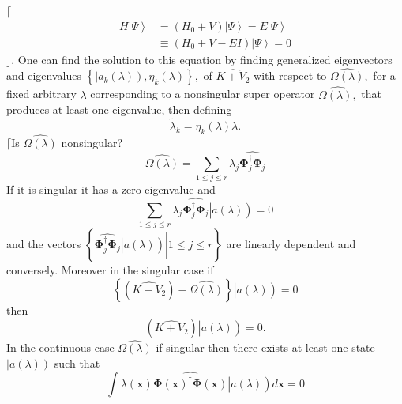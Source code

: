 \documentclass[aps,preprint]{revtex4}%
\begin{document}
$\lceil$%
\begin{align}
H\left\vert \Psi\right\rangle  &  =\left(  H_{0}+V\right)  \left\vert
\Psi\right\rangle =E\left\vert \Psi\right\rangle \nonumber\\
&  \equiv\left(  H_{0}+V-EI\right)  \left\vert \Psi\right\rangle =0
\end{align}
$\rfloor$. One can find the solution to this equation by finding generalized
eigenvectors and eigenvalues $\left\{  \left\vert a_{k}\left(  \lambda\right)
\right)  ,\eta_{k}\left(  \lambda\right)  \right\}  ,$ of $\widehat{K+V_{2}}$
with respect to $\widehat{\Omega\left(  \lambda\right)  },$ for a fixed
arbitrary $\lambda$ corresponding to a nonsingular super operator
$\widehat{\Omega\left(  \lambda\right)  ,}$ that produces at least one
eigenvalue, then defining
\begin{equation}
\tilde{\lambda}_{k}=\eta_{k}\left(  \lambda\right)  \lambda.
\end{equation}
$\lceil$Is $\widehat{\Omega\left(  \lambda\right)  }$ nonsingular?
\begin{equation}
\widehat{\Omega\left(  \lambda\right)  }=\sum_{1\leq j\leq r}\lambda
_{j}\widehat{\mathbf{\Phi}_{j}^{\dagger}\mathbf{\Phi}_{j}}%
\end{equation}
If it is singular it has a zero eigenvalue and
\begin{equation}
\sum_{1\leq j\leq r}\lambda_{j}\widehat{\mathbf{\Phi}_{j}^{\dagger
}\mathbf{\Phi}_{j}}\left\vert \overset{}{a\left(  \lambda\right)  }\right)  =0
\end{equation}
and the vectors $\left\{  \left.  \widehat{\mathbf{\Phi}_{j}^{\dagger
}\mathbf{\Phi}_{j}}\left\vert \overset{}{a\left(  \lambda\right)  }\right)
\right\vert 1\leq j\leq r\right\}  $ are linearly dependent and conversely.
Moreover in the singular case if
\begin{equation}
\left\{  \left(  \widehat{K+V_{2}}\right)  -\widehat{\Omega\left(
\lambda\right)  }\right\}  \left\vert \overset{}{a\left(  \lambda\right)
}\right)  =0
\end{equation}
then
\begin{equation}
\left(  \widehat{K+V_{2}}\right)  \left\vert \overset{}{a\left(
\lambda\right)  }\right)  =0.
\end{equation}
In the continuous case $\widehat{\Omega\left(  \lambda\right)  }$ if singular
then there exists at least one state $\left\vert a\left(  \lambda\right)
\right)  $ such that
\begin{equation}
\int\lambda\left(  \mathbf{x}\right)  \widehat{\mathbf{\Phi}\left(
\mathbf{x}\right)  ^{\dagger}\mathbf{\Phi}\left(  \mathbf{x}\right)
}\left\vert \overset{}{a\left(  \lambda\right)  }\right)  d\mathbf{x}=0
\end{equation}
\end{document}
